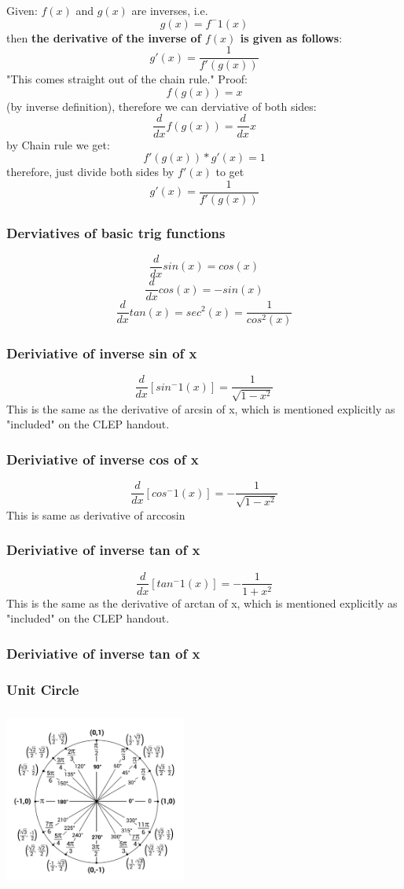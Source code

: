 \documentclass[12pt, letterpaper]{article}
\begin{document}
Given: $f(x)$ and $g(x)$ are inverses, i.e. \[g(x) = f^-1(x)\]
then \textbf{the derivative of the inverse of $f(x)$ is given as follows}:
\[g'(x) = \frac{1}{f'(g(x))}\]
"This comes straight out of the chain rule."  Proof:
\[f(g(x)) = x\] 
(by inverse definition), therefore we can derviative of both sides:
\[ \frac{d}{dx} f(g(x)) = \frac{d}{dx} x\]
by Chain rule we get:
\[f'(g(x))*g'(x) = 1 \]
therefore, just divide both sides by $f'(x)$ to get
\[g'(x) = \frac{1}{f'(g(x))}\]
\subsubsection{Derviatives of basic trig functions}
\[\frac{d}{dx} sin(x) = cos(x)\]
\[\frac{d}{dx} cos(x) = -sin(x)\]
\[\frac{d}{dx} tan(x) = sec^2(x)= \frac{1}{cos^2(x)}\]
\subsubsection{Deriviative of inverse sin of x}
\[\frac{d}{dx}[sin^-1(x)] = \frac{1}{\sqrt{1 - x^2}}\]
This is the same as the derivative of arcsin of x, which is mentioned explicitly as "included" on the CLEP handout.
\subsubsection{Deriviative of inverse cos of x}
\[\frac{d}{dx}[cos^-1(x)] = - \frac{1}{\sqrt{1 - x^2}}\]
This is same as derivative of arccosin
\subsubsection{Deriviative of inverse tan of x}
\[\frac{d}{dx}[tan^-1(x)] = - \frac{1}{1 + x^2}\]
This is the same as the derivative of arctan of x, which is mentioned explicitly as "included" on the CLEP handout.

\subsubsection{Deriviative of inverse tan of x}

\subsubsection{Unit Circle}
\includegraphics[width=6cm, height=6cm]{unit-circle.png}
\end{document}

